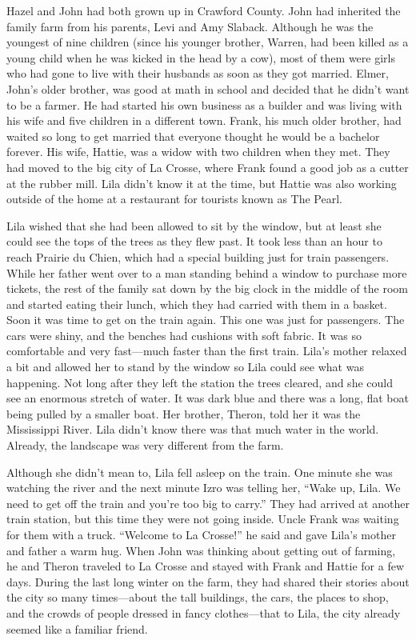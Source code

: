 \documentclass[
  american,
  letterpaper,
]{book}
\begin{document}
Hazel and John had both grown up in Crawford County. John had inherited
the family farm from his parents, Levi and Amy Slaback. Although he was
the youngest of nine children (since his younger brother, Warren, had
been killed as a young child when he was kicked in the head by a cow),
most of them were girls who had gone to live with their husbands as soon
as they got married. Elmer, John's older brother, was good at math in
school and decided that he didn't want to be a farmer. He had started
his own business as a builder and was living with his wife and five
children in a different town. Frank, his much older brother, had waited
so long to get married that everyone thought he would be a bachelor
forever. His wife, Hattie, was a widow with two children when they met.
They had moved to the big city of La Crosse, where Frank found a good
job as a cutter at the rubber mill. Lila didn't know it at the time, but
Hattie was also working outside of the home at a restaurant for tourists
known as The Pearl.

Lila wished that she had been allowed to sit by the window, but at least
she could see the tops of the trees as they flew past. It took less than
an hour to reach Prairie du Chien, which had a special building just for
train passengers. While her father went over to a man standing behind a
window to purchase more tickets, the rest of the family sat down by the
big clock in the middle of the room and started eating their lunch,
which they had carried with them in a basket. Soon it was time to get on
the train again. This one was just for passengers. The cars were shiny,
and the benches had cushions with soft fabric. It was so comfortable and
very fast---much faster than the first train. Lila's mother relaxed a
bit and allowed her to stand by the window so Lila could see what was
happening. Not long after they left the station the trees cleared, and
she could see an enormous stretch of water. It was dark blue and there
was a long, flat boat being pulled by a smaller boat. Her brother,
Theron, told her it was the Mississippi River. Lila didn't know there
was that much water in the world. Already, the landscape was very
different from the farm.

Although she didn't mean to, Lila fell asleep on the train. One minute
she was watching the river and the next minute Izro was telling her,
``Wake up, Lila. We need to get off the train and you're too big to
carry.'' They had arrived at another train station, but this time they
were not going inside. Uncle Frank was waiting for them with a truck.
``Welcome to La Crosse!'' he said and gave Lila's mother and father a
warm hug. When John was thinking about getting out of farming, he and
Theron traveled to La Crosse and stayed with Frank and Hattie for a few
days. During the last long winter on the farm, they had shared their
stories about the city so many times---about the tall buildings, the
cars, the places to shop, and the crowds of people dressed in fancy
clothes---that to Lila, the city already seemed like a familiar friend.
\end{document}
